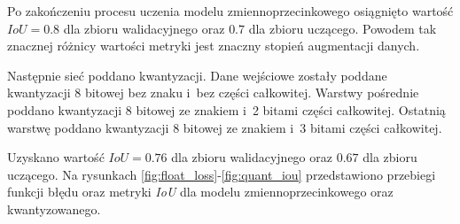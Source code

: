Po zakończeniu procesu uczenia modelu zmiennoprzecinkowego osiągnięto wartość $IoU = 0.8$ dla zbioru walidacyjnego oraz $0.7$ dla zbioru uczącego. 
Powodem tak znacznej różnicy wartości metryki jest znaczny stopień augmentacji danych.

Następnie sieć poddano kwantyzacji. 
Dane wejściowe zostały poddane kwantyzacji 8 bitowej bez znaku i~bez części całkowitej.
Warstwy pośrednie poddano kwantyzacji 8 bitowej ze znakiem i~2 bitami części całkowitej.
Ostatnią warstwę poddano kwantyzacji 8 bitowej ze znakiem i~3 bitami części całkowitej.

Uzyskano wartość $IoU = 0.76$ dla zbioru walidacyjnego oraz $0.67$ dla zbioru uczącego.
Na rysunkach \ref{fig:float_loss}-\ref{fig:quant_iou} przedstawiono przebiegi funkcji błędu oraz metryki \emph{IoU} dla modelu zmiennoprzecinkowego oraz kwantyzowanego.

